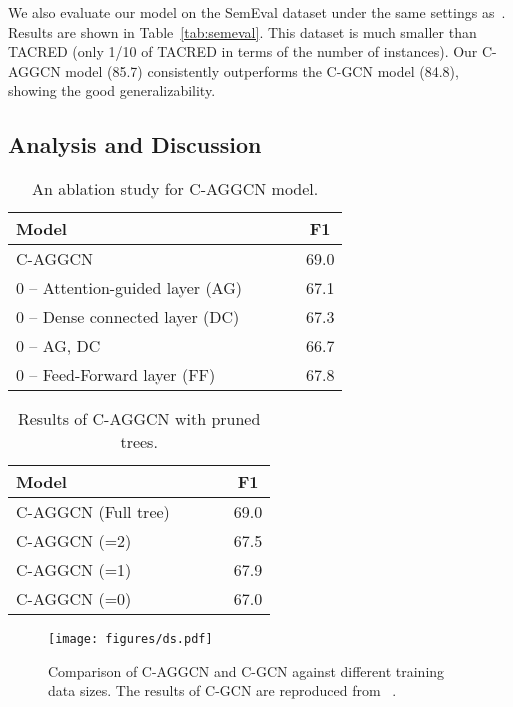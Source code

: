 \documentclass[11pt,a4paper]{article}
\begin{document}
We also evaluate our model on the SemEval dataset under the same settings as~\citep{Zhang2018GraphCO}. Results are shown in Table~\ref{tab:semeval}. This dataset is much smaller than TACRED (only 1/10 of TACRED in terms of the number of instances). Our C-AGGCN model (85.7) consistently outperforms the  C-GCN model (84.8), showing the good  generalizability.




\subsection{Analysis and Discussion}

\begin{table}[!t]
\centering
\setlength{\tabcolsep}{3pt}
\begin{tabular}{lcccc}
\toprule
\bf Model & & & &F1 \\
\midrule
C-AGGCN              & & & & 69.0\\
{\color{white}0}   -- Attention-guided layer (AG) &  & & & 67.1\\
{\color{white}0}   -- Dense connected layer (DC)  &  & & & 67.3 \\
{\color{white}0}   -- AG, DC   &  & & &66.7\\
{\color{white}0}   -- Feed-Forward layer (FF)    &  & & & 67.8\\
\bottomrule
\end{tabular}
\caption{An ablation study for C-AGGCN model. }
\label{tab:ablation}
\end{table}

 

\begin{table}[!t]
\centering
\setlength{\tabcolsep}{3pt}
\begin{tabular}{lcccc}
\toprule
\bf Model & & & &F1 \\
\midrule
C-AGGCN (Full tree)             & & & & 69.0\\
C-AGGCN (=2)             & & & & 67.5\\
C-AGGCN (=1)             & & & & 67.9\\
C-AGGCN (=0)             & & & & 67.0\\
\bottomrule
\end{tabular}
\caption{Results of C-AGGCN with pruned trees.}
\label{tab:prune_tree}
\end{table}

 
\begin{figure*}
    \centering
    \texttt{[image: figures/ds.pdf]}
\caption{Comparison of C-AGGCN and C-GCN against different training data sizes. The results of C-GCN are reproduced from ~\cite{Zhang2018GraphCO}.}
    \label{fig:comp}
\end{figure*}
\end{document}

